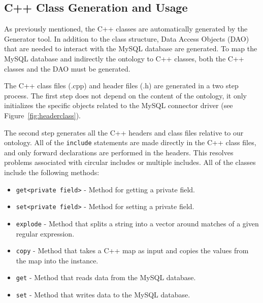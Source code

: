 \subsection{C++ Class Generation and Usage}
As previously mentioned, the C++ classes are automatically generated by the Generator tool. In addition to the class structure, 
Data Access Objects (DAO) that are needed to interact with the MySQL database are generated. 
To map the MySQL database and indirectly the ontology to C++ classes, both the C++ classes and
the DAO must be generated.

The C++ class files (.cpp) and header files (.h) are generated in a two step process.
The first step does not depend on the content of the ontology, it only initializes the specific objects related to the MySQL connector driver
(see Figure~\ref{fig:headerclass}).

The second step generates all the C++ headers and class files relative to our ontology. 
All of the \texttt{include} statements  are made directly in the C++ class files, and only forward declarations are performed in the headers. 
This resolves problems associated with circular includes or multiple includes. All of the classes include the following methods:
\begin{itemize}
\item \texttt{get<private field>} - Method for getting a private field.
\item \texttt{set<private field>} - Method for setting a private field.
\item \texttt{explode} - Method that splits a string into a vector around matches of a given regular expression. 
\item \texttt{copy} -  Method that takes a C++ map as input and copies the values from the map into the instance.
\item \texttt{get} - Method that reads data from the MySQL database.
\item \texttt{set} - Method that writes data to the MySQL database.
\end{itemize}

